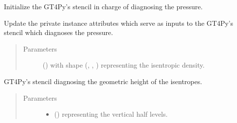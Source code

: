 \documentclass[letterpaper,10pt,english]{sphinxmanual}
\begin{document}
\begin{fulllineitems}

\begin{fulllineitems}
\label{\detokenize{api:dycore.diagnostic_isentropic.DiagnosticIsentropic._stencil_diagnosing_air_pressure_initialize}}
Initialize the GT4Py’s stencil in charge of diagnosing the pressure.

\end{fulllineitems}


\begin{fulllineitems}
\label{\detokenize{api:dycore.diagnostic_isentropic.DiagnosticIsentropic._stencil_diagnosing_air_pressure_set_inputs}}
Update the private instance attributes which serve as inputs to the GT4Py’s stencil which diagnoses the pressure.
\begin{quote}\begin{description}
\item[{Parameters}] \leavevmode
{} () \textendash{}  with shape (, , ) representing the isentropic density.

\end{description}\end{quote}

\end{fulllineitems}


\begin{fulllineitems}
\label{\detokenize{api:dycore.diagnostic_isentropic.DiagnosticIsentropic._stencil_diagnosing_height_defs}}
GT4Py’s stencil diagnosing the geometric height of the isentropes.
\begin{quote}\begin{description}
\item[{Parameters}] \leavevmode\begin{itemize}
\item {} 
 () \textendash{}  representing the vertical half levels.


\end{itemize}
\end{description}
\end{quote}
\end{fulllineitems}
\end{fulllineitems}
\end{document}
